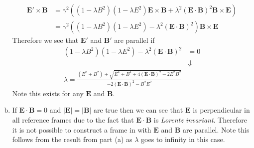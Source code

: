 \documentclass[11pt]{article}
\numberwithin{equation}{section}
\begin{document}
\begin{enumerate}[(a)]
\begin{align*}
        \mathbf{E}'\times\mathbf{B} &= \gamma^2\left((1-\lambda{B^2})(1-\lambda{E^2})\mathbf{E}\times\mathbf{B} + \lambda^2(\mathbf{E}\cdot\mathbf{B})^2\mathbf{B}\times\mathbf{E}\right)\\
        &= \gamma^2\left((1-\lambda{B^2})(1-\lambda{E^2}) - \lambda^2(\mathbf{E}\cdot\mathbf{B})^2\right)\mathbf{B}\times\mathbf{E}
    \end{align*}
    Therefore we see that $\mathbf{E}'$ and $\mathbf{B}'$ are parallel if
    \begin{align*}
        (1-\lambda{B^2})(1-\lambda{E^2}) - \lambda^2(\mathbf{E}\cdot\mathbf{B})^2 &= 0\\
                                     &\Downarrow\\
        \lambda = \frac{(E^2+B^2) \pm \sqrt{E^4+B^4+4(\mathbf{E}\cdot\mathbf{B})^2 - 2E^2B^2}}{-2(\mathbf{E}\cdot\mathbf{B})^2-B^2E^2}
    \end{align*}
    Note this exists for any $\mathbf{E}$ and $\mathbf{B}$.

\item
    If $\mathbf{E}\cdot\mathbf{B}=0$ and $|\mathbf{E}|=|\mathbf{B}|$ are true then we can see that $\mathbf{E}$ is perpendicular in all 
    reference frames due to the fact that $\mathbf{E}\cdot\mathbf{B}$ is \emph{Lorentz invariant}. 
    Therefore it is not possible to construct a frame in with $\mathbf{E}$ and $\mathbf{B}$ are parallel. 
    Note this follows from the result from part (a) as $\lambda$ goes to infinity in this case.


\end{enumerate}
\end{document}

